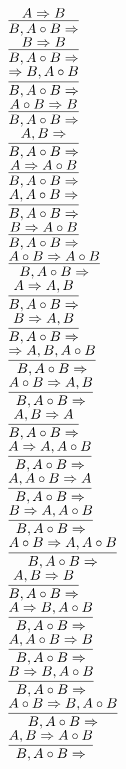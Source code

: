 \documentclass[11pt]{article}
\begin{document}
\begin{center}
\bigskip
\\$\infer{B, A\circ B\Rightarrow }{A\Rightarrow B}$
\bigskip
\\$\infer{B, A\circ B\Rightarrow }{B\Rightarrow B}$
\bigskip
\\$\infer{B, A\circ B\Rightarrow }{\Rightarrow B, A\circ B}$
\bigskip
\\$\infer{B, A\circ B\Rightarrow }{A\circ B\Rightarrow B}$
\bigskip
\\$\infer{B, A\circ B\Rightarrow }{A, B\Rightarrow }$
\bigskip
\\$\infer{B, A\circ B\Rightarrow }{A\Rightarrow A\circ B}$
\bigskip
\\$\infer{B, A\circ B\Rightarrow }{A, A\circ B\Rightarrow }$
\bigskip
\\$\infer{B, A\circ B\Rightarrow }{B\Rightarrow A\circ B}$
\bigskip
\\$\infer{B, A\circ B\Rightarrow }{A\circ B\Rightarrow A\circ B}$
\bigskip
\\$\infer{B, A\circ B\Rightarrow }{A\Rightarrow A, B}$
\bigskip
\\$\infer{B, A\circ B\Rightarrow }{B\Rightarrow A, B}$
\bigskip
\\$\infer{B, A\circ B\Rightarrow }{\Rightarrow A, B, A\circ B}$
\bigskip
\\$\infer{B, A\circ B\Rightarrow }{A\circ B\Rightarrow A, B}$
\bigskip
\\$\infer{B, A\circ B\Rightarrow }{A, B\Rightarrow A}$
\bigskip
\\$\infer{B, A\circ B\Rightarrow }{A\Rightarrow A, A\circ B}$
\bigskip
\\$\infer{B, A\circ B\Rightarrow }{A, A\circ B\Rightarrow A}$
\bigskip
\\$\infer{B, A\circ B\Rightarrow }{B\Rightarrow A, A\circ B}$
\bigskip
\\$\infer{B, A\circ B\Rightarrow }{A\circ B\Rightarrow A, A\circ B}$
\bigskip
\\$\infer{B, A\circ B\Rightarrow }{A, B\Rightarrow B}$
\bigskip
\\$\infer{B, A\circ B\Rightarrow }{A\Rightarrow B, A\circ B}$
\bigskip
\\$\infer{B, A\circ B\Rightarrow }{A, A\circ B\Rightarrow B}$
\bigskip
\\$\infer{B, A\circ B\Rightarrow }{B\Rightarrow B, A\circ B}$
\bigskip
\\$\infer{B, A\circ B\Rightarrow }{A\circ B\Rightarrow B, A\circ B}$
\bigskip
\\$\infer{B, A\circ B\Rightarrow }{A, B\Rightarrow A\circ B}$

\end{center}
\end{document}
